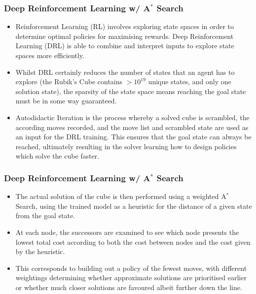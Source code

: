 \documentclass{beamer}
\begin{document}
\begin{frame}
\frametitle{Deep Reinforcement Learning w/ A$^\ast$ Search}
\begin{itemize}
    \item Reinforcement Learning (RL) involves exploring state spaces in order to determine optimal policies for maximising rewards. Deep Reinforcement Learning (DRL) is able to combine and interpret inputs to explore state spaces more efficiently.
    \item Whilst DRL certainly reduces the number of states that an agent has to explore (the Rubik's Cube contains $ > 10^{19}$ unique states, and only one solution state), the sparsity of the state space means reaching the goal state must be in some way guaranteed.
    \item Autodidactic Iteration is the process whereby a solved cube is scrambled, the according moves recorded, and the move list and scrambled state are used as an input for the DRL training. This ensures that the goal state can always be reached, ultimately resulting in the solver learning how to design policies which solve the cube faster.
\end{itemize}
\end{frame}

\begin{frame}
\frametitle{Deep Reinforcement Learning w/ A$^\ast$ Search}
\begin{itemize}
    \item The actual solution of the cube is then performed using a weighted A$^\ast$ Search, using the trained model as a heuristic for the distance of a given state from the goal state.
    \item At each node, the successors are examined to see which node presents the lowest total cost according to both the cost between nodes and the cost given by the heuristic. 
    \item This corresponds to building out a policy of the fewest moves, with different weightings determining whether approximate solutions are prioritised earlier or whether much closer solutions are favoured albeit further down the line. 
\end{itemize}
\end{frame}
\end{document}
